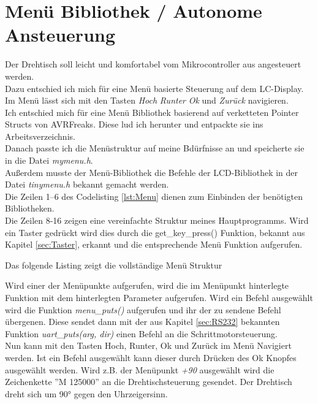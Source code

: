\section{Menü Bibliothek / Autonome Ansteuerung}
Der Drehtisch soll leicht und komfortabel vom Mikrocontroller aus angesteuert werden.\\
Dazu entschied ich mich für eine Menü basierte Steuerung auf dem LC-Display. Im Menü lässt sich mit den Tasten \emph{Hoch} \emph{Runter} \emph{Ok} und \emph{Zurück} navigieren.\\
Ich entschied mich für eine Menü Bibliothek basierend auf verketteten Pointer Structs von AVRFreaks\cite{AVRFreaks:Menu}. Diese lud ich herunter und entpackte sie ins Arbeitsverzeichnis.\\
Danach passte ich die Menüstruktur auf meine Bdürfnisse an und speicherte sie in die Datei \emph{mymenu.h}.\\
Außerdem musste der Menü-Bibliothek die Befehle der LCD-Bibliothek in der Datei \emph{tinymenu.h} bekannt gemacht werden.\\
Die Zeilen 1--6 des Codelisting \ref{lst:Menu} dienen zum Einbinden der benötigten Bibliotheken.\\
Die Zeilen 8-16 zeigen eine vereinfachte Struktur meines  Hauptprogramms. Wird ein Taster gedrückt wird dies durch die get\_key\_press() Funktion, bekannt aus Kapitel \ref{sec:Taster}, erkannt und die entsprechende Menü Funktion aufgerufen.
\lstset{language=C, basicstyle=\footnotesize, showstringspaces=false, tabsize=8}

Das folgende Listing zeigt die vollständige Menü Struktur
\lstset{language=C, basicstyle=\footnotesize, showstringspaces=false, tabsize=8}

Wird einer der Menüpunkte aufgerufen, wird die im Menüpunkt hinterlegte Funktion mit dem hinterlegten Parameter aufgerufen.
Wird ein Befehl ausgewählt wird die Funktion \emph{menu\_puts()} aufgerufen und ihr der zu sendene Befehl übergenen. Diese sendet dann mit der aus Kapitel \ref{sec:RS232} bekannten Funktion \emph{uart\_puts(arg, dir)} einen Befehl an die Schrittmotorsteuerung.\\
Nun kann mit den Tasten Hoch, Runter, Ok und Zurück im Menü Navigiert werden. Ist ein Befehl ausgewählt kann dieser durch Drücken des Ok Knopfes ausgewählt werden. Wird z.B. der Menüpunkt \emph{+90} ausgewählt wird die Zeichenkette ''M 125000'' an die Drehtischsteuerung gesendet. Der Drehtisch dreht sich um 90° gegen den Uhrzeigersinn.


